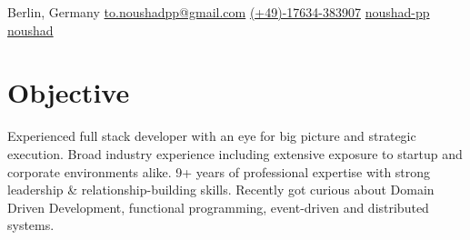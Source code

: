 \documentclass{resume_base}
\begin{document}
	\contact
		{\color{\themeColor} \iconSpace \small {} \color{black}Berlin, Germany}
		{\color{\themeColor} \iconSpace \small {} \href{mailto://to.noushadpp@gmail.com}{to.noushadpp@gmail.com}}
		{\color{\themeColor} \iconSpace \small {}  \href{tel://+4917634383907}{(+49)-17634-383907}}
		{\color{\themeColor} \iconSpace \small {} \href{https://github.com/noushad-pp/}{noushad-pp}}
		{\color{\themeColor} \iconSpace \small {} \href{https://stackoverflow.com/users/5466933/noushad?tab=profile}{noushad}}
	
	\section{Objective}\label{sec:objective}
		\hspace{1pt}\parbox{0.99\textwidth}{
			Experienced full stack developer with an eye for big picture and strategic execution. Broad industry experience including extensive exposure to startup and corporate environments alike. 9+ years of professional expertise with strong leadership \& relationship-building skills. Recently got curious about Domain Driven Development, functional programming, event-driven and distributed systems.
		}

\end{document}
